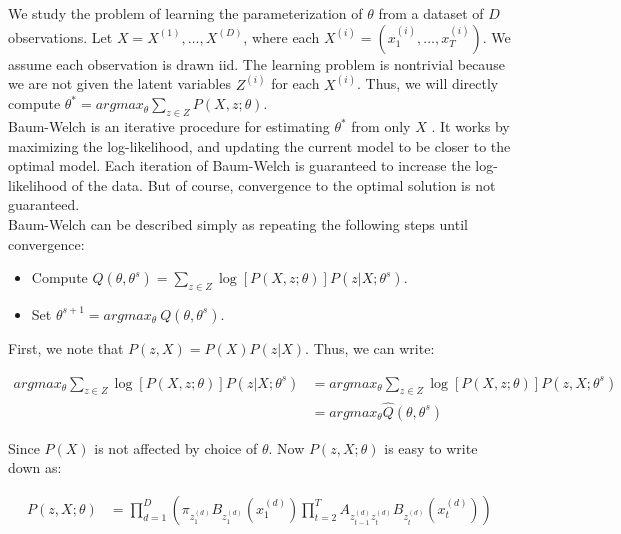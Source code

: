 \documentclass[twoside,11pt]{article}\usepackage{amsmath,amsfonts,amsthm,fullpage}
\begin{document}
We study the problem of learning the parameterization of $\theta$ from a dataset of $D$ observations. Let $X = X^{(1)}, \ldots , X^{(D)}$, where each $X^{(i)} = (x^{(i)}_1, \ldots, x^{(i)}_T)$. We assume each observation is drawn iid. The learning problem is nontrivial because we are not given the latent variables $Z^{(i)}$ for each $X^{(i)}$. Thus, we will directly compute $\theta^* = argmax_{\theta} \sum_{z \in Z} P(X , z; \theta)$. \\

Baum-Welch is an iterative procedure for estimating $\theta^*$ from only $X$ . It works by maximizing the log-likelihood, and updating the current model to be closer to the optimal model. Each iteration of Baum-Welch is guaranteed to increase the log-likelihood of the data. But of course, convergence to the optimal solution is not guaranteed. \\

Baum-Welch can be described simply as repeating the following steps until convergence:

\begin{itemize}
\item Compute $Q(\theta, \theta^s) = \sum_{z \in Z} \log [P(X , z; \theta)] P(z | X ; \theta^s)$.
\item Set $\theta^{s+1} = argmax_{\theta}\ Q(\theta, \theta^s)$.
\end{itemize}

First, we note that $P(z, X ) = P(X )P(z|X )$. Thus, we can write:

\begin{equation} \nonumber
\begin{split}
argmax_{\theta} \sum_{z \in Z} \log [P(X , z; \theta)] P(z|X ; \theta^s) &= argmax_\theta \sum_{z \in Z} \log [P(X , z; \theta)] P(z, X ; \theta^s) \\
&= argmax_{\theta} \hat{Q}(\theta, \theta^s)
\end{split}
\end{equation}

Since $P(X)$ is not affected by choice of $\theta$. Now $P(z, X ; \theta)$ is easy to write down as:

\begin{equation} \nonumber
\begin{split}
P(z, X ; \theta) &= \prod^D_{d=1} \left( \pi_{z_1^{(d)}} B_{z_1^{(d)}} (x_1^{(d)}) \prod^T_{t=2} A_{{z_{t-1}^{(d)}}{z_{t}^{(d)}}} B_{z_t^{(d)}} (x_t^{(d)}) \right)
\end{split}
\end{equation}
\end{document}
